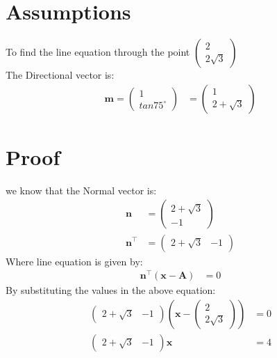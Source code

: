 \documentclass[journal,10pt,twocolumn]{article}
\let\vec\mathbf
\newcommand{\myvec}[1]{\ensuremath{\begin{pmatrix}#1\end{pmatrix}}}
\providecommand{\brak}[1]{\ensuremath{\left(#1\right)}}
\begin{document}
\section{Assumptions}
To find the line equation  through the point $\myvec{2\\2\sqrt{3}}$\\
The Directional vector is:
\begin{align}
\vec{m}=\myvec{1\\tan75^\circ}
	&=\myvec{1\\2+\sqrt{3}}
\end{align}
  
\section{Proof}
we know that the Normal vector is:
\begin{align}
	\vec{n}&=\myvec{2+\sqrt{3}\\-1}\\
	\vec{n}^\top&=\myvec{2+\sqrt{3}&-1}	
\end{align}
Where line equation  is given by:
\begin{align}
	\vec{n}^\top \brak{\vec{x}-\vec{A}}&= 0 
\end{align}
By substituting the values in the above equation:
\begin{align}
	\myvec{2+\sqrt{3} &-1}\brak{\vec{x}-\myvec{2\\2\sqrt{3}}}&=0\\
	\myvec{2+\sqrt{3}&-1}\vec{x}&=4
\end{align}
\end{document}
